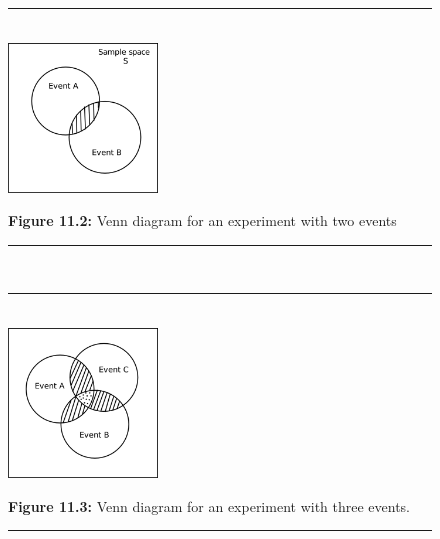     \setcounter{subfigure}{0}
	\begin{figure}[H] %
    \begin{center}
    \rule[.1in]{\figurerulewidth}{.005in} \\
        \label{m39377*uid1211!!!underscore!!!media}\label{m39377*uid1211!!!underscore!!!printimage}\includegraphics[width=150px]{col11306.imgs/m39377_venn1.png} %
      \vspace{2pt}
    \vspace{\rubberspace}\par \begin{cnxcaption}
	  \small \textbf{Figure 11.2: }Venn diagram for an experiment with two events
	\end{cnxcaption}
    \vspace{.1in}
    \rule[.1in]{\figurerulewidth}{.005in} \\
    \end{center}
 \end{figure}       
    \setcounter{subfigure}{0}
	\begin{figure}[H] %
    \begin{center}
    \rule[.1in]{\figurerulewidth}{.005in} \\
        \label{m39377*uid1222!!!underscore!!!media}\label{m39377*uid1222!!!underscore!!!printimage}\includegraphics[width=150px]{col11306.imgs/m39377_venn2.png} %
      \vspace{2pt}
    \vspace{\rubberspace}\par \begin{cnxcaption}
	  \small \textbf{Figure 11.3: }Venn diagram for an experiment with three events.
	\end{cnxcaption}
    \vspace{.1in}
    \rule[.1in]{\figurerulewidth}{.005in} \\
    \end{center}
 \end{figure}       
